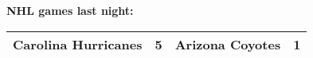 \textbf{NHL games last night:}
\begin{tabular}{llll}
\toprule
Carolina Hurricanes & 5 & Arizona Coyotes & 1 \\
\bottomrule
\end{tabular}
